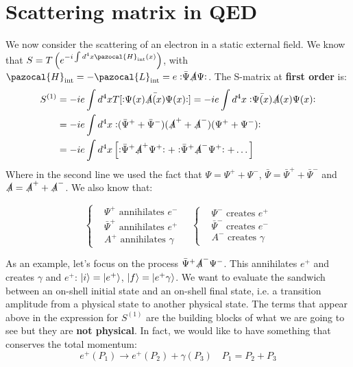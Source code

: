 \documentclass[../main.tex]{subfiles}
\begin{document}
\section{Scattering matrix in QED}
We now consider the scattering of an electron in a static external field. We know that $S=T\left(e^{-i\int d^4x\pazocal{H}_{\text{int}}(x)}\right)$, with $\pazocal{H}_{\text{int}}=-\pazocal{L}_{\text{int}}=e\norder{\bar{\Psi}\slashed{A}\Psi}$. The S-matrix at \textbf{first order} is:
\begin{align*}
S^{(1)}&=-ie\int d^4xT[\bar{\vcentcolon\mathrel{\Psi(x)\slashed{A}(x)\Psi(x)}\vcentcolon}]=-ie\int d^4x\vcentcolon\mathrel{\bar{\Psi(x)}\slashed{A}(x)\Psi(x)}\vcentcolon\\
&=-ie\int d^4x\vcentcolon\mathrel{(\bar{\Psi}^++\bar{\Psi}^-)(\slashed{A}^++\slashed{A}^-)(\Psi^++\Psi^-)}\vcentcolon\\
&=-ie\int d^4x\left[\vcentcolon\mathrel{\bar{\Psi}^+\slashed{A}^+\Psi^+}\vcentcolon+\vcentcolon\mathrel{\bar{\Psi}^+\slashed{A}^-\Psi^+}\vcentcolon+\dots\right]
\end{align*}
Where in the second line we used the fact that $\Psi=\Psi^++\Psi^-$, $\bar{\Psi}=\bar{\Psi}^++\bar{\Psi}^-$ and $\slashed{A}=\slashed{A}^++\slashed{A}^-$. We also know that:
\begin{kaobox}[frametitle=Creation and annihilation]
\[
\left\{
\begin{aligned}
&\Psi^+ \text{ annihilates } e^-\\
&\bar{\Psi}^+ \text{ annihilates } e^+\\
&A^+ \text{ annihilates } \gamma
\end{aligned}
\right.
\quad
\left\{
\begin{aligned}
&\Psi^- \text{ creates } e^+\\
&\bar{\Psi}^- \text{ creates } e^-\\
&A^- \text{ creates } \gamma
\end{aligned}
\right.
\]
\end{kaobox}
As an example, let's focus on the process $\bar{\Psi}^+\slashed{A}^-\Psi^-$. This annihilates $e^+$ and creates $\gamma$ and $e^+$: $\ket{i}=\ket{e^+}$, $\ket{f}=\ket{e^+\gamma}$. We want to evaluate the sandwich between an on-shell initial state and an on-shell final state, i.e. a transition amplitude from a physical state to another physical state. The terms that appear above in the expression for $S^{(1)}$ are the building blocks of what we are going to see but they are \textbf{not physical}. In fact, we would like to have something that conserves the total momentum:
\[
e^+(P_1)\xrightarrow[]{}e^+(P_2)+\gamma(P_3) \quad P_1=P_2+P_3
\]
\end{document}
